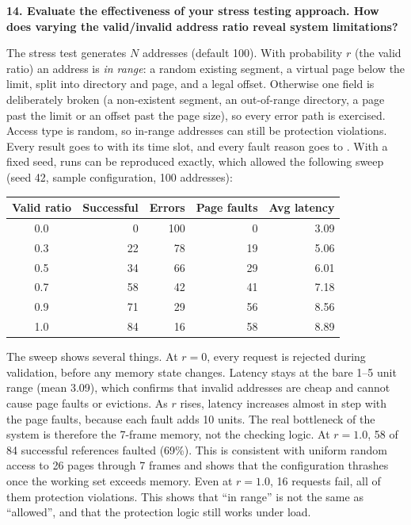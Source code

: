 \documentclass[11pt]{article}
\newcommand{\code}[1]{\texttt{\detokenize{#1}}}
\newcommand{\question}[1]{\par\medskip\noindent\textbf{#1}\par\smallskip}
\begin{document}
\question{14. Evaluate the effectiveness of your stress testing approach. How does varying the valid/invalid address ratio reveal system limitations?}
The stress test generates $N$ addresses (default 100). With probability $r$ (the valid ratio) an address is \emph{in range}:
a random existing segment, a virtual page below the limit, split into directory and page, and a
legal offset. Otherwise one field is deliberately broken (a non-existent segment, an out-of-range
directory, a page past the limit or an offset past the page size), so every error path is exercised.
Access type is random, so in-range addresses can still be protection violations. Every result goes to
\code{results.txt} with its time slot, and every fault reason goes to \code{errors.log}. With a fixed
seed, runs can be reproduced exactly, which allowed the following sweep (seed 42, sample
configuration, 100 addresses):

\begin{center}
\begin{tabular}{@{}crrrr@{}}
\toprule
Valid ratio & Successful & Errors & Page faults & Avg latency \\
\midrule
0.0 & 0 & 100 & 0 & 3.09 \\
0.3 & 22 & 78 & 19 & 5.06 \\
0.5 & 34 & 66 & 29 & 6.01 \\
0.7 & 58 & 42 & 41 & 7.18 \\
0.9 & 71 & 29 & 56 & 8.56 \\
1.0 & 84 & 16 & 58 & 8.89 \\
\bottomrule
\end{tabular}
\end{center}

The sweep shows several things. At $r = 0$, every request is rejected during validation, before any memory
state changes. Latency stays at the bare 1--5 unit range (mean 3.09), which confirms that invalid
addresses are cheap and cannot cause page faults or evictions. As $r$ rises, latency increases almost
in step with the page faults, because each fault adds 10 units. The real bottleneck of the system is
therefore the 7-frame memory, not the checking logic. At $r = 1.0$, 58 of 84 successful references
faulted (69\%). This is consistent with uniform random access to 26 pages through 7 frames and shows that the
configuration thrashes once the working set exceeds memory. Even at $r = 1.0$, 16 requests fail, all of them
protection violations. This shows that ``in range'' is not the same as ``allowed'', and that the
protection logic still works under load.
\end{document}
